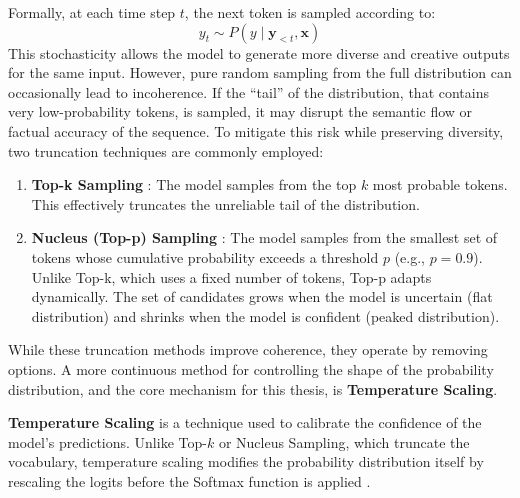 Formally, at each time step $t$, the next token is sampled according 
to: 
\begin{equation}
    y_t \sim P(y \mid \mathbf{y}_{<t}, \mathbf{x})
    \label{eq:sampling}
\end{equation}
This stochasticity allows the model to generate more diverse and 
creative outputs for the same input. However, pure random sampling
from the full distribution can occasionally lead to incoherence.
If the ``tail'' of the distribution, that contains very low-probability
tokens, is sampled, it may disrupt the semantic flow or factual 
accuracy of the sequence.
To mitigate this risk while preserving diversity, two truncation 
techniques are commonly employed:
\begin{enumerate}
	\item \textbf{Top-k Sampling} 
	    \parencite{fan2018hierarchicalneuralstorygeneration}:
		The model samples from the top $k$ most probable
		tokens. This effectively truncates the unreliable
		tail of the distribution. 
	\item \textbf{Nucleus (Top-p) Sampling}
	    \parencite{holtzman2020curiouscaseneuraltext}:
		The model samples from the smallest set of tokens
		whose cumulative probability exceeds a threshold
		$p$ (e.g., $p = 0.9$). Unlike Top-k, which uses
		a fixed number of tokens, Top-p adapts dynamically.
		The set of candidates grows when the model is 
		uncertain (flat distribution) and shrinks when the 
		model is confident (peaked distribution).
\end{enumerate}
While these truncation methods improve coherence, they operate 
by removing options. A more continuous method for controlling the shape 
of the probability distribution, and the core mechanism for this 
thesis, is \textbf{Temperature Scaling}.

\textbf{Temperature Scaling} is a technique used to calibrate the
confidence of the model's predictions. Unlike Top-$k$ or 
Nucleus Sampling, which truncate the vocabulary, temperature
scaling modifies the probability distribution itself by rescaling 
the logits before the Softmax function is applied
\parencite{hinton2015distilling}.

